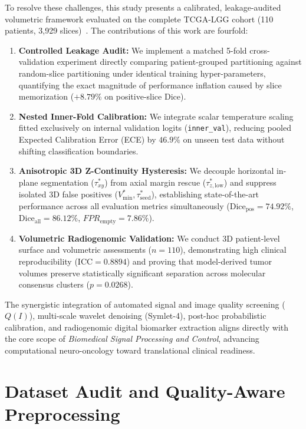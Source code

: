 \documentclass[preprint,3p,times,onecolumn]{elsarticle}
\begin{document}
To resolve these challenges, this study presents a calibrated, leakage-audited volumetric framework evaluated on the complete TCGA-LGG cohort (110 patients, 3,929 slices)~\cite{buda2019association}. The contributions of this work are fourfold:
\begin{enumerate}
    \item \textbf{Controlled Leakage Audit:} We implement a matched 5-fold cross-validation experiment directly comparing patient-grouped partitioning against random-slice partitioning under identical training hyper-parameters, quantifying the exact magnitude of performance inflation caused by slice memorization ($+8.79\%$ on positive-slice Dice).
    \item \textbf{Nested Inner-Fold Calibration:} We integrate scalar temperature scaling fitted exclusively on internal validation logits (\texttt{inner\_val}), reducing pooled Expected Calibration Error (ECE) by $46.9\%$ on unseen test data without shifting classification boundaries.
    \item \textbf{Anisotropic 3D Z-Continuity Hysteresis:} We decouple horizontal in-plane segmentation ($\tau_{xy}^*$) from axial margin rescue ($\tau_{z,\mathrm{low}}^*$) and suppress isolated 3D false positives ($V_{\mathrm{min}}^*, \tau_{\mathrm{seed}}^*$), establishing state-of-the-art performance across all evaluation metrics simultaneously ($\text{Dice}_{\text{pos}} = 74.92\%$, $\text{Dice}_{\text{all}} = 86.12\%$, $FPR_{\mathrm{empty}} = 7.86\%$).
    \item \textbf{Volumetric Radiogenomic Validation:} We conduct 3D patient-level surface and volumetric assessments ($n=110$), demonstrating high clinical reproducibility ($\text{ICC} = 0.8894$) and proving that model-derived tumor volumes preserve statistically significant separation across molecular consensus clusters ($p = 0.0268$).
\end{enumerate}

The synergistic integration of automated signal and image quality screening ($Q(I)$), multi-scale wavelet denoising (Symlet-4), post-hoc probabilistic calibration, and radiogenomic digital biomarker extraction aligns directly with the core scope of \textit{Biomedical Signal Processing and Control}, advancing computational neuro-oncology toward translational clinical readiness.

\section{Dataset Audit and Quality-Aware Preprocessing}
\label{sec:dataset}
\end{document}
